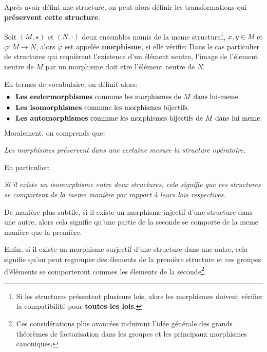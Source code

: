 \subsection*{}
Aprés avoir défini une structure, on peut alors définir les transformations qui \textbf{préservent cette structure}.\<

Soit \((M, \star)\) et \((N, \cdot)\) deux ensembles munis de la meme structure\footnote[2]{Si les structures présentent plusieurs lois, alors les morphismes doivent vérifier la compatibilité pour \textbf{toutes les lois}.}, \(x, y \in M\) et \(\varphi: M \rightarrow N\), alors \(\varphi\) est appelée \textbf{morphisme}, si elle vérifie:
Dans le cas particulier de structures qui requièrent l'existence d'un élément neutre, l'image de l'élement neutre de \(M\) par un morphisme doit etre l'élément neutre de \(N\).\<

En termes de vocabulaire, on définit alors: 
\begin{align*}
   &\bullet \;\; \text{\textbf{Les endormorphismes} commme les morphismes de \(M\) dans lui-meme.}\\
   &\bullet \;\; \text{\textbf{Les isomorphismes} commme les morphismes bijectifs.}\\
   &\bullet \;\; \text{\textbf{Les automorphismes} commme les morphismes bijectifs de \(M\) dans lui-meme.}
\end{align*}
Moralement, on comprends que:
\begin{center}
   \textit{Les morphismes préservent dans une certaine mesure la structure opératoire.}
\end{center}
En particulier:
\begin{center}
   \textit{Si il existe un isomorphisme entre deux structures, cela signifie que ces structures se comportent de la meme manière par rapport à leurs lois respectives.}
\end{center}
De manière plus subtile, si il existe un morphisme injectif d'une structure dans une autre, alors cela signifie qu'une partie de la seconde se comporte de la meme manière que la première. \<

Enfin, si il existe un morphisme surjectif d'une structure dans une autre, cela signifie qu'on peut regrouper des élements de la première structure et ces groupes d'éléments se comporteront commes les élements de la seconde\footnote[1]{Ces considérations plus avancées induiront l'idée générale des grands théorèmes de factorisation dans les groupes et les principaux morphismes canoniques.}.
